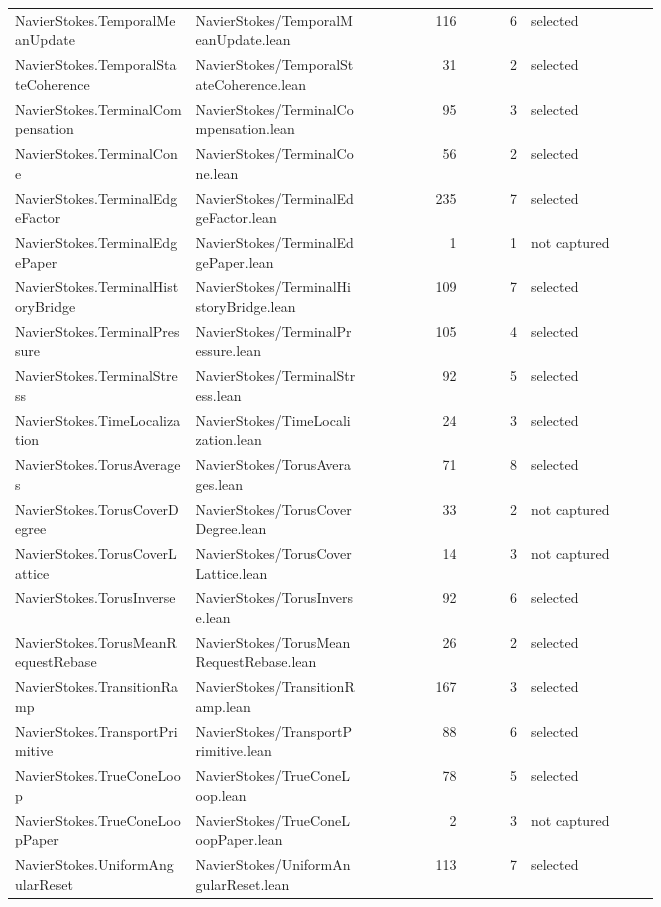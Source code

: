 \documentclass[10pt]{article}
\begin{document}
\begin{longtable}{p{0.28\linewidth}p{0.27\linewidth}r r p{0.20\linewidth}}
NavierStokes.TemporalMeanUpdate & NavierStokes/TemporalMeanUpdate.lean & 116 & 6 & selected\\
NavierStokes.TemporalStateCoherence & NavierStokes/TemporalStateCoherence.lean & 31 & 2 & selected\\
NavierStokes.TerminalCompensation & NavierStokes/TerminalCompensation.lean & 95 & 3 & selected\\
NavierStokes.TerminalCone & NavierStokes/TerminalCone.lean & 56 & 2 & selected\\
NavierStokes.TerminalEdgeFactor & NavierStokes/TerminalEdgeFactor.lean & 235 & 7 & selected\\
NavierStokes.TerminalEdgePaper & NavierStokes/TerminalEdgePaper.lean & 1 & 1 & not captured\\
NavierStokes.TerminalHistoryBridge & NavierStokes/TerminalHistoryBridge.lean & 109 & 7 & selected\\
NavierStokes.TerminalPressure & NavierStokes/TerminalPressure.lean & 105 & 4 & selected\\
NavierStokes.TerminalStress & NavierStokes/TerminalStress.lean & 92 & 5 & selected\\
NavierStokes.TimeLocalization & NavierStokes/TimeLocalization.lean & 24 & 3 & selected\\
NavierStokes.TorusAverages & NavierStokes/TorusAverages.lean & 71 & 8 & selected\\
NavierStokes.TorusCoverDegree & NavierStokes/TorusCoverDegree.lean & 33 & 2 & not captured\\
NavierStokes.TorusCoverLattice & NavierStokes/TorusCoverLattice.lean & 14 & 3 & not captured\\
NavierStokes.TorusInverse & NavierStokes/TorusInverse.lean & 92 & 6 & selected\\
NavierStokes.TorusMeanRequestRebase & NavierStokes/TorusMeanRequestRebase.lean & 26 & 2 & selected\\
NavierStokes.TransitionRamp & NavierStokes/TransitionRamp.lean & 167 & 3 & selected\\
NavierStokes.TransportPrimitive & NavierStokes/TransportPrimitive.lean & 88 & 6 & selected\\
NavierStokes.TrueConeLoop & NavierStokes/TrueConeLoop.lean & 78 & 5 & selected\\
NavierStokes.TrueConeLoopPaper & NavierStokes/TrueConeLoopPaper.lean & 2 & 3 & not captured\\
NavierStokes.UniformAngularReset & NavierStokes/UniformAngularReset.lean & 113 & 7 & selected\\

\end{longtable}
\end{document}

